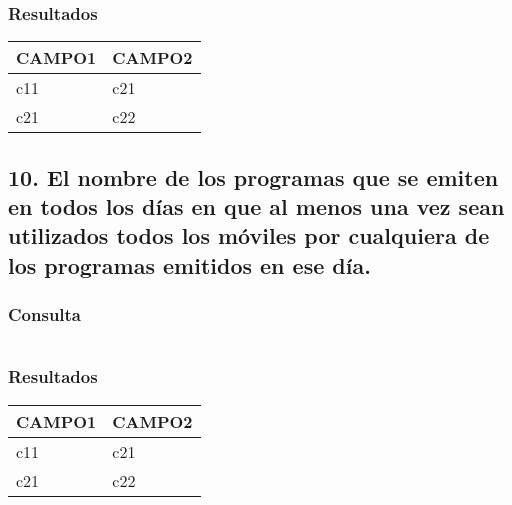 \subsubsection*{Resultados}
\begin{tabular}{|l|l|}
  \hline
    \bf{CAMPO1} & \bf{CAMPO2} \\ 
  \hline
    c11 & c21 \\ 
    c21 & c22 \\
  \hline
\end{tabular} 

\subsection*{10. \normalsize{El nombre de los programas que se emiten en todos los d\'ias en que al menos una vez sean utilizados todos los m\'oviles por cualquiera de los programas emitidos en ese d\'ia.}}

\subsubsection*{Consulta}
\begin{lstlisting} 

\end{lstlisting}

\subsubsection*{Resultados}
\begin{tabular}{|l|l|}
  \hline
    \bf{CAMPO1} & \bf{CAMPO2} \\ 
  \hline
    c11 & c21 \\ 
    c21 & c22 \\
  \hline
\end{tabular} 
